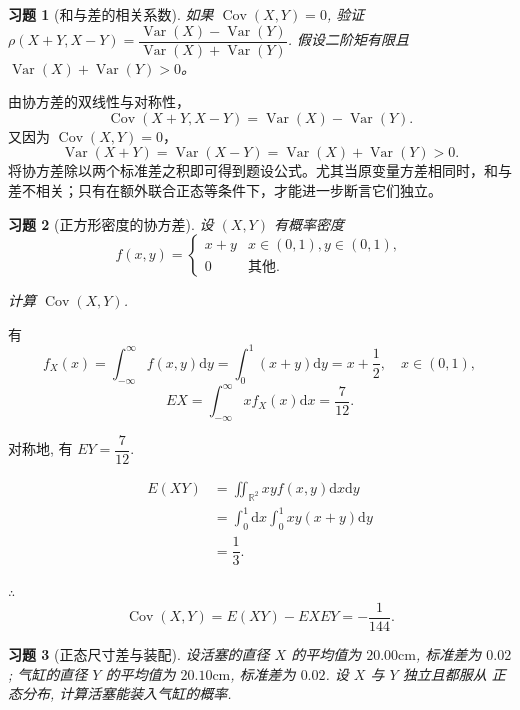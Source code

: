 \documentclass[12pt,fontset=fandol]{ctexart}
\newtheorem{exercise}{习题}[section]
\begin{document}
\begin{exercise}[和与差的相关系数]\label{q:A5.26}
如果 $\operatorname{Cov}(X,Y)=0$, 验证 $\rho(X+Y,X-Y)=\dfrac{\operatorname{Var}(X)-\operatorname{Var}(Y)}{\operatorname{Var}(X)+\operatorname{Var}(Y)}$. 假设二阶矩有限且 $\operatorname{Var}(X)+\operatorname{Var}(Y)>0$。\par{}
\end{exercise}

\begin{solve}\label{a:A5.26}由协方差的双线性与对称性，\[\operatorname{Cov}(X+Y,X-Y)=\operatorname{Var}(X)-\operatorname{Var}(Y).\]又因为 $\operatorname{Cov}(X,Y)=0$，\[\operatorname{Var}(X+Y)=\operatorname{Var}(X-Y)=\operatorname{Var}(X)+\operatorname{Var}(Y)>0.\]将协方差除以两个标准差之积即可得到题设公式。尤其当原变量方差相同时，和与差不相关；只有在额外联合正态等条件下，才能进一步断言它们独立。\end{solve}

\begin{exercise}[正方形密度的协方差]\label{q:A5.28}
设 $(X,Y)$ 有概率密度
    \[f(x,y)=\begin{cases}
        x+y & x\in(0,1),y\in(0,1), \\
        0 & \text{其他}.
    \end{cases}\]

    计算 $\operatorname{Cov}(X,Y)$.\par{}
\end{exercise}

\begin{solve}\label{a:A5.28}
    有
    \[f_X(x)=\int_{-\infty}^\infty f(x,y)\mathrm{d}y=\int_0^1(x+y)\mathrm{d}y=x+\dfrac{1}{2},\quad x\in(0,1),\]
    \[EX=\int_{-\infty}^\infty xf_X(x)\mathrm{d}x=\dfrac{7}{12}.\]

    对称地, 有 $EY=\dfrac{7}{12}$.

    \[\begin{aligned}E(XY)&=\iint_{\mathbb{R}^2}xyf(x,y)\mathrm{d}x\mathrm{d}y\\&=\int_0^1\mathrm{d}x\int_0^1xy(x+y)\mathrm{d}y\\&=\dfrac{1}{3}.\end{aligned}\]

    $\therefore$
    \[\operatorname{Cov}(X,Y)=E(XY)-EXEY=-\dfrac{1}{144}.\]
\end{solve}

\begin{exercise}[正态尺寸差与装配]\label{q:A5.30}
设活塞的直径 $X$ 的平均值为 $20.00\text{cm}$, 标准差为 $0.02$; 气缸的直径 $Y$ 的平均值为 $20.10\text{cm}$, 标准差为 $0.02$. 设 $X$ 与 $Y$ 独立且都服从 正态分布, 计算活塞能装入气缸的概率.\par{}
\end{exercise}
\end{document}
